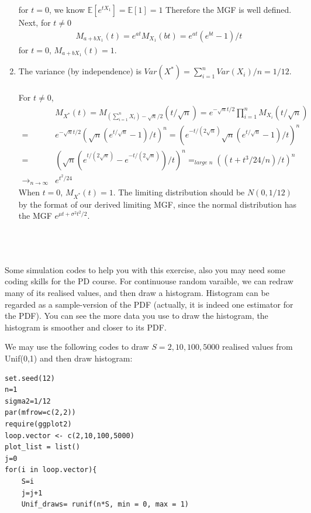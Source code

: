 \begin{Solution}{1.29}
\begin{enumerate}
  for $t=0$, we know $	\mathbb{E}[e^{tX_1}]=	\mathbb{E}[1]=1$	
  Therefore the MGF is well defined. Next, for $t\neq 0$
  \begin{align*}
  	M_{a+b X_1}(t) = e^{at}M_{X_1}(bt)= e^{at}\left(e^{bt}-1\right)/t
  \end{align*}	
  for $t=0$, $	M_{a+b X_1}(t) = 1$.
  \item 						The variance (by independence) is $Var(X^*)=\sum_{i=1}^nVar(X_i)/n = 1/12$.\\~\\
  For $t\neq 0$,
  \begin{align*}
  	&M_{X^*}(t) = M_{\left(\sum_{i=1}^n X_i\right) -\sqrt{n}/2  }(t/\sqrt{n}) =e^{-\sqrt{n}t/2 }\prod_{i=1}^nM_{ X_i}(t/\sqrt{n})\\
  	=& e^{-\sqrt{n}t/2 } \left(\sqrt{n}\left(e^{t/\sqrt{n}} -1 \right)/t\right)^n= \left(e^{-t/(2\sqrt{n}) }\sqrt{n}\left(e^{t/\sqrt{n}} -1 \right)/t\right)^n\\
  	=&  \left(\sqrt{n}\left(e^{t/(2\sqrt{n})} -e^{-t/(2\sqrt{n}) } \right)/t\right)^n =_{\textit{large n}} \left((t+t^3/24/n)/t\right)^n\\ \rightarrow_{n\rightarrow \infty}& e^{t^2/24}
  \end{align*}	
  When $t=0$, $M_{X^*}(t) =1$. 	
  The limiting distribution should be $N(0,1/12)$ by the format of our derived limiting MGF, since the normal distribution has the MGF $e^{\mu t + \sigma^2t^2/2 }$.	
  	\end{enumerate}
  ~\\~\\~\\
  Some simulation codes to help you with this exercise, also you may need some coding skills for the PD course.
  For continuouse random varaible, we can redraw many of its realised values, and then draw a histogram. Histogram can be regarded as a sample-version of the PDF (actually, it is indeed one estimator for the PDF). You can see the more data you use to draw the histogram, the histogram is smoother and closer to its PDF.

  We may use the following codes to draw $S=2,10,100,5000$ realised values from Unif(0,1) and then draw histogram:
  \begin{verbatim}
set.seed(12)
n=1
sigma2=1/12
par(mfrow=c(2,2))
require(ggplot2)
loop.vector <- c(2,10,100,5000)
plot_list = list()
j=0
for(i in loop.vector){
	S=i
	j=j+1
	Unif_draws= runif(n*S, min = 0, max = 1)
	

\end{verbatim}
\end{Solution}
